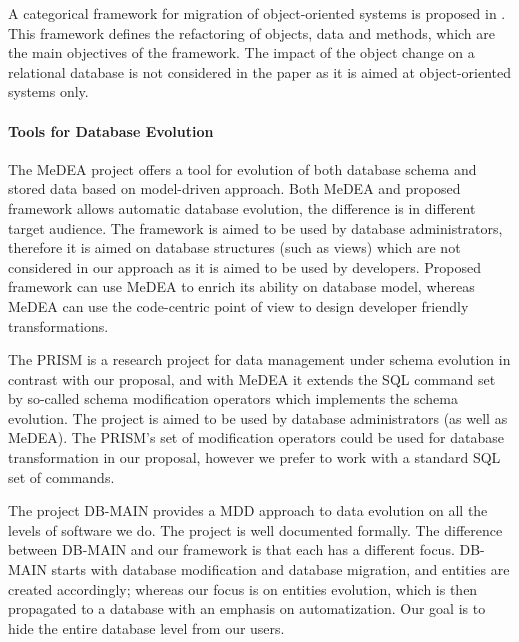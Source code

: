 \documentclass[11pt]{article}
\begin{document}
A categorical framework for migration of object-oriented systems is proposed in \cite{Schulz:CategoricalModel}. This framework defines the refactoring of objects, data and methods, which are the main objectives of the framework. The impact of the object change on a relational database is not considered in the paper as it is aimed at object-oriented systems only.


\paragraph{Tools for Database Evolution} The MeDEA project \cite{Meda:Main} offers a tool for evolution of both database schema and stored data based on model-driven approach. Both MeDEA and proposed framework allows automatic database evolution, the difference is in different target audience.  The framework is aimed to be used by database administrators, therefore it is aimed on database structures (such as views) which are not considered in our approach as it is aimed to be used by developers. Proposed framework can use MeDEA to enrich its ability on database model, whereas MeDEA can use the code-centric point of view to design developer friendly transformations.

The PRISM is a research project for data management under schema evolution \cite{PRISM} in contrast with our proposal, and with MeDEA it extends the SQL command set by so-called schema modification operators which implements the schema evolution. The project is aimed to  be used by database administrators (as well as MeDEA). The PRISM's set of modification operators could be used for database transformation in our proposal, however we prefer to work with a standard SQL set of commands. 

The project DB-MAIN \cite{Hick:DBMAIN} provides a MDD approach to data evolution on all the levels of software we do. The project is well documented formally. The difference between DB-MAIN and our framework is that each has a different focus. DB-MAIN starts with database modification and database migration, and entities are created accordingly; whereas our focus is on entities evolution, which is then propagated to a database with an emphasis on automatization. Our goal is to hide the entire database level from our users.
\end{document}
